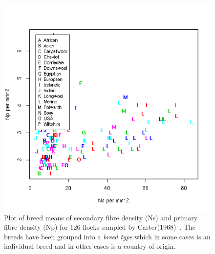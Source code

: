 %

\begin{figure}[!h]
  \centering
   \includegraphics[width=1.0\textwidth]{NsNpalltype.png}
  \caption{Plot of breed means of secondary fibre density (Ns) and primary fibre density (Np) for 126 flocks sampled by Carter(1968)~\cite{cart:68}. The breeds have been grouped into a {\em breed type} which in some cases is an individual breed and in other cases is a country of origin. }
  \label{fig:NsNptype}
\end{figure}

%

